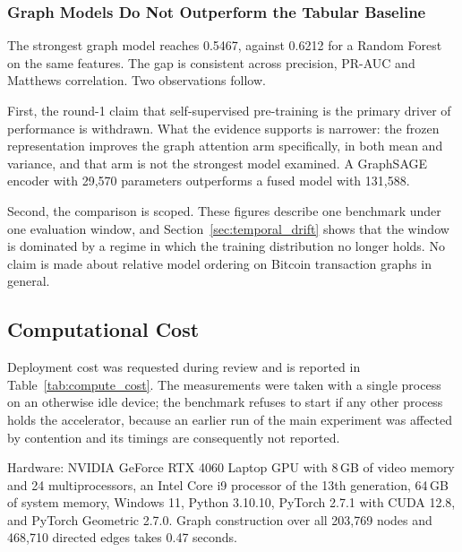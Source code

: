 \documentclass[12pt,a4paper]{article}
\begin{document}
\subsubsection{Graph Models Do Not Outperform the Tabular Baseline}

The strongest graph model reaches 0.5467, against 0.6212 for a
Random Forest on the same features. The gap is consistent across
precision, PR-AUC and Matthews correlation. Two observations
follow.

First, the round-1 claim that self-supervised pre-training is the
primary driver of performance is withdrawn. What the evidence
supports is narrower: the frozen representation improves the
graph attention arm specifically, in both mean and variance, and
that arm is not the strongest model examined. A GraphSAGE
encoder with 29,570 parameters outperforms a fused model with
131,588.

Second, the comparison is scoped. These figures describe one
benchmark under one evaluation window, and
Section~\ref{sec:temporal_drift} shows that the window is
dominated by a regime in which the training distribution no
longer holds. No claim is made about relative model ordering on
Bitcoin transaction graphs in general.


\subsection{Computational Cost}
\label{sec:compute_cost}

Deployment cost was requested during review and is reported in
Table~\ref{tab:compute_cost}. The measurements were taken with a
single process on an otherwise idle device; the benchmark refuses
to start if any other process holds the accelerator, because an
earlier run of the main experiment was affected by contention and
its timings are consequently not reported.

Hardware: NVIDIA GeForce RTX 4060 Laptop GPU with 8\,GB of video
memory and 24 multiprocessors, an Intel Core i9 processor of the
13th generation, 64\,GB of system memory, Windows 11, Python
3.10.10, PyTorch 2.7.1 with CUDA 12.8, and PyTorch Geometric
2.7.0. Graph construction over all 203,769 nodes and 468,710
directed edges takes 0.47 seconds.
\end{document}
